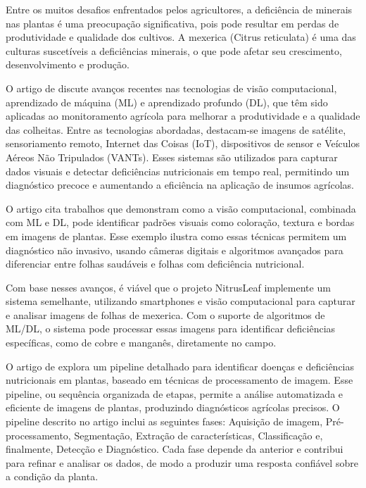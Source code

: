 Entre os muitos desafios enfrentados pelos agricultores, a deficiência de minerais nas plantas é uma preocupação significativa, pois pode resultar em perdas de produtividade e qualidade dos cultivos. A mexerica (Citrus reticulata) é uma das culturas suscetíveis a deficiências minerais, o que pode afetar seu crescimento, desenvolvimento e produção.

O artigo de \textcite{EstadoArte1} discute avanços recentes nas tecnologias de visão computacional, aprendizado de máquina (ML) e aprendizado profundo (DL), que têm sido aplicadas ao monitoramento agrícola para melhorar a produtividade e a qualidade das colheitas. Entre as tecnologias abordadas, destacam-se imagens de satélite, sensoriamento remoto, Internet das Coisas (IoT), dispositivos de sensor e Veículos Aéreos Não Tripulados (VANTs). Esses sistemas são utilizados para capturar dados visuais e detectar deficiências nutricionais em tempo real, permitindo um diagnóstico precoce e aumentando a eficiência na aplicação de insumos agrícolas.

O artigo cita trabalhos que demonstram como a visão computacional, combinada com ML e DL, pode identificar padrões visuais como coloração, textura e bordas em imagens de plantas. Esse exemplo ilustra como essas técnicas permitem um diagnóstico não invasivo, usando câmeras digitais e algoritmos avançados para diferenciar entre folhas saudáveis e folhas com deficiência nutricional.

Com base nesses avanços, é viável que o projeto NitrusLeaf implemente um sistema semelhante, utilizando smartphones e visão computacional para capturar e analisar imagens de folhas de mexerica. Com o suporte de algoritmos de ML/DL, o sistema pode processar essas imagens para identificar deficiências específicas, como de cobre e manganês, diretamente no campo.

O artigo de \cite{EstadoArte2} explora um pipeline detalhado  para identificar doenças e deficiências nutricionais em plantas, baseado em técnicas de processamento de imagem. Esse pipeline, ou sequência organizada de etapas, permite a análise automatizada e eficiente de imagens de plantas, produzindo diagnósticos agrícolas precisos. O pipeline descrito no artigo inclui as seguintes fases: Aquisição de imagem, Pré-processamento, Segmentação, Extração de características, Classificação e, finalmente, Detecção e Diagnóstico. Cada fase depende da anterior e contribui para refinar e analisar os dados, de modo a produzir uma resposta confiável sobre a condição da planta.


